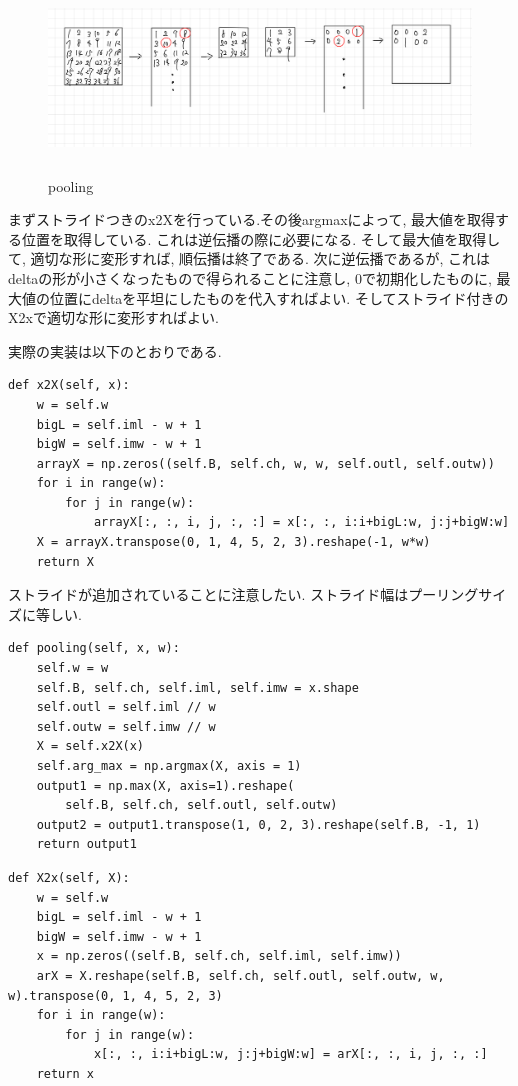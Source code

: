 \documentclass[a4paper,11pt]{jsarticle}
\begin{document}
\begin{figure}[h]
  \centering
  \includegraphics[height = 5cm]{pooling.jpg}
  \caption{pooling}
\end{figure}
まずストライドつきのx2Xを行っている.その後argmaxによって, 最大値を取得する位置を取得している.
これは逆伝播の際に必要になる. そして最大値を取得して, 適切な形に変形すれば, 順伝播は終了である.
次に逆伝播であるが, これはdeltaの形が小さくなったもので得られることに注意し, 0で初期化したものに, 
最大値の位置にdeltaを平坦にしたものを代入すればよい. そしてストライド付きのX2xで適切な形に変形すればよい.

実際の実装は以下のとおりである.
\begin{lstlisting}[caption=pooling\_x2X]
  def x2X(self, x):
    w = self.w
    bigL = self.iml - w + 1
    bigW = self.imw - w + 1
    arrayX = np.zeros((self.B, self.ch, w, w, self.outl, self.outw))
    for i in range(w):
        for j in range(w):
            arrayX[:, :, i, j, :, :] = x[:, :, i:i+bigL:w, j:j+bigW:w]
    X = arrayX.transpose(0, 1, 4, 5, 2, 3).reshape(-1, w*w)
    return X
\end{lstlisting}
ストライドが追加されていることに注意したい. ストライド幅はプーリングサイズに等しい.

\begin{lstlisting}[caption=pooling\_prop]
  def pooling(self, x, w):
    self.w = w
    self.B, self.ch, self.iml, self.imw = x.shape
    self.outl = self.iml // w
    self.outw = self.imw // w
    X = self.x2X(x)
    self.arg_max = np.argmax(X, axis = 1)
    output1 = np.max(X, axis=1).reshape(
        self.B, self.ch, self.outl, self.outw)
    output2 = output1.transpose(1, 0, 2, 3).reshape(self.B, -1, 1)
    return output1
\end{lstlisting}

\begin{lstlisting}[caption=pooling\_X2x]
  def X2x(self, X):
    w = self.w
    bigL = self.iml - w + 1
    bigW = self.imw - w + 1
    x = np.zeros((self.B, self.ch, self.iml, self.imw))
    arX = X.reshape(self.B, self.ch, self.outl, self.outw, w, w).transpose(0, 1, 4, 5, 2, 3)
    for i in range(w):
        for j in range(w):
            x[:, :, i:i+bigL:w, j:j+bigW:w] = arX[:, :, i, j, :, :]
    return x
\end{lstlisting}
\end{document}

